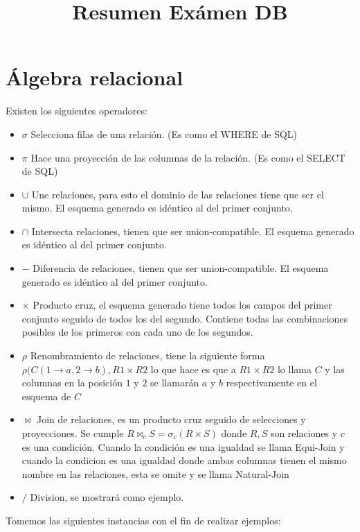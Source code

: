\documentclass[11pt,letterpaper]{article}
\title{\vspace{-3em}Resumen Exámen DB}
\date{\vspace{-4em}}
\begin{document}
\lstset{language=SQL}
\maketitle
\section{Álgebra relacional}
Existen los siguientes operadores:
\begin{itemize}
	\item $\sigma$ Selecciona filas de una relación. (Es como el WHERE de SQL)
	\item $\pi$ Hace una proyección de las columnas de la relación. (Es como el SELECT de SQL)
	\item $\cup$ Une relaciones, para esto el dominio de las relaciones tiene que ser el mismo. El esquema generado es idéntico al del primer conjunto.
	\item $\cap$ Intersecta relaciones, tienen que ser union-compatible. El esquema generado es idéntico al del primer conjunto.
	\item $-$ Diferencia de relaciones, tienen que ser union-compatible. El esquema generado es idéntico al del primer conjunto.
	\item $\times$ Producto cruz, el esquema generado tiene todos los campos del primer conjunto seguido de todos los del segundo. Contiene todas las combinaciones posibles de los primeros con cada uno de los segundos.
	\item $\rho$ Renombramiento de relaciones, tiene la siguiente forma $\rho (C(1 \rightarrow a, 2 \rightarrow b), R1 \times R2$ lo que hace es que a $R1 \times R2$ lo llama $C$ y las columnas en la posición $1$ y $2$ se llamarán $a$ y $b$ respectivamente en el esquema de $C$ 
	\item  $\Join$ Join de relaciones, es un producto cruz seguido de selecciones y proyecciones. \newline Se cumple $R \Join_c S = \sigma_c( R \times S)$ donde $R,S$ son relaciones y $c$ es una condición. Cuando la condición es una igualdad se llama Equi-Join y cuando la condicion es una igualdad donde ambas columnas tienen el mismo nombre en las relaciones, esta se omite y se llama Natural-Join
	\item $/$ Division, se mostrará como ejemplo.
\end{itemize}
Tomemos las siguientes instancias con el fin de realizar ejemplos:
\end{document}

